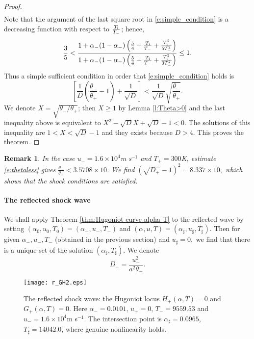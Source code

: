 \documentclass[10pt,a4paper]{article}
\newtheorem{nb}{Remark}[section]
\numberwithin{equation}{section}
\newcommand{\Ti}{T_{\rm i}}
\begin{document}
\begin{proof}
\begin{eqnarray}
\end{eqnarray}
Note that the argument of the last square root in \eqref{e:simple_condition}
is a decreasing function with respect to $\frac{\Ti}{T_-}$; hence,
$$
   \frac{3}{5} <  \frac{1 + \alpha_-(1 - \alpha_-)\left(\frac{5}{4} + \frac{\Ti}{T_-} + \frac{\Ti^2}{5T_-^2}\right)}{1 + \alpha_-(1 - \alpha_-)\left(\frac{5}{4} + \frac{\Ti}{T_-} + \frac{\Ti^2}{3T_-^2}\right)} \leq 1.
$$ 
Thus a simple sufficient condition in order that \eqref{e:simple_condition} holds is
$$
   \left[\frac{1}{D}\left(\frac{\theta_-}{\theta_+} - 1\right) + \frac{1}{\sqrt{D}}\right]
< \frac{1}{\sqrt{D}}\sqrt{\frac{\theta_-}{\theta_+}}.
$$
We denote $X = \sqrt{\theta_-/\theta_+}$; then $X\ge1$ by Lemma \ref{l:Theta>0} and the last inequality above is equivalent to 
$
  X^2 - \sqrt{D}X + \sqrt{D} -1 < 0.
$
The solutions of this inequality are $1 < X <  \sqrt{D} -1$ and they exists because $D>4$. This proves the theorem.
\end{proof}
\begin{nb}\label{nb:shock condition}
In the case $u_- = 1.6 \times 10^4${\rm m s}${}^{-1}$ and $T_{+} = 300 ${\rm K}, estimate \eqref{e:thetaless} gives $\frac{\theta_-}{\theta_+}<3.5708 \times 10$. We find $(\sqrt{D_+} - 1)^2 = 8.337 \times 10,$
which shows that the shock conditions are satisfied.
\end{nb}

\paragraph{The reflected shock wave} 
We shall apply Theorem \ref{thm:Hugoniot curve alpha T}  to the reflected wave by setting $(\alpha_0, u_0, T_0) = (\alpha_-, u_-, T_-)$ and $(\alpha, u, T)  = (\alpha_{\sharp}, u_{\sharp},T_{\sharp}).$ Then for given $\alpha_-, u_-, T_-$ (obtained in the previous section) and $u_{\sharp} = 0,$ we find that there is a unique set of the solution $(\alpha_{\sharp}, T_{\sharp}).$ We denote
\begin{equation}\label{e:DA}
D_- = \frac{u_-^2}{a^2 \theta_-}.
\end{equation}

\begin{figure}[hbt]
\centering
 \texttt{[image: r\_GH2.eps]}
 \caption{The reflected shock wave: the Hugoniot locus $H_+(\alpha,T)=0$ and $G_+(\alpha, T) = 0$. Here 
 $\alpha_- = 0.0101$, $u_+=0 $, $T_{-} = 9559.53$ and $u_- = 1.6 \times 10^4${\rm m s}${}^{-1}$. The intersection point is
 $\alpha_\sharp = 0.0965$, $T_\sharp = 14042.0$, where genuine nonlinearity holds.}
 \label{fig:Hugoniot+G(a,T)_16000_reflection}
\end{figure}
\end{document}
